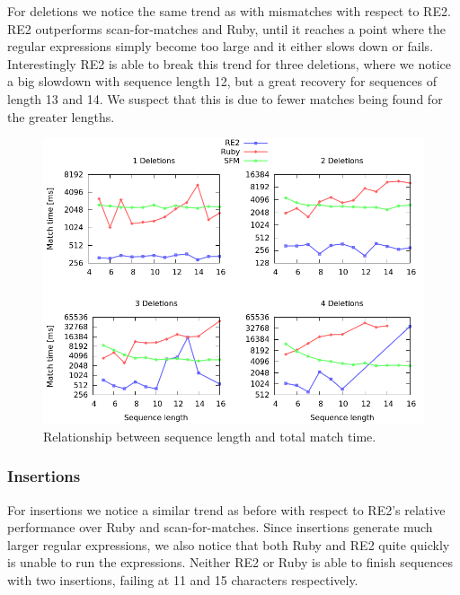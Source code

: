 \documentclass[12pt]{article}
\theoremstyle{definition}
\begin{document}
For deletions we notice the same trend as with mismatches with respect to RE2. RE2 outperforms scan-for-matches and Ruby, until it reaches a point where the regular expressions simply become too large and it either slows down or fails. Interestingly RE2 is able to break this trend for three deletions, where we notice a big slowdown with sequence length 12, but a great recovery for sequences of length 13 and 14. We suspect that this is due to fewer matches being found for the greater lengths.

\begin{figure}[H]
	\begin{center}
		\includegraphics[scale=0.55]{graphs/seq_length_deletions.png}	
	\end{center}
	\caption{Relationship between sequence length and total match time.}
	\label{graph:cases:deletions}
\end{figure}


\subsubsection{Insertions}

For insertions we notice a similar trend as before with respect to RE2's relative performance over Ruby and scan-for-matches. Since insertions generate much larger regular expressions, we also notice that both Ruby and RE2 quite quickly is unable to run the expressions. Neither RE2 or Ruby is able to finish sequences with two insertions, failing at 11 and 15 characters respectively.
\end{document}
